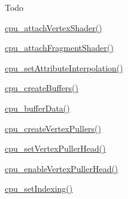 \begin{DoxyRefDesc}{Todo}
\begin{DoxyItemize}
\item \hyperlink{program_8h_aaefc7833a6deea461cc06d00318f7975}{cpu\+\_\+attach\+Vertex\+Shader()}
\item \hyperlink{program_8h_a402ad69a9f1b80b8de408b991e190ed6}{cpu\+\_\+attach\+Fragment\+Shader()}
\item \hyperlink{program_8h_aca1c5019ec58c919160c4c12a5e5fa06}{cpu\+\_\+set\+Attribute\+Interpolation()}
\item \hyperlink{buffer_8h_a6ba9c58dc4b7bc81e83d3dae3c6b292f}{cpu\+\_\+create\+Buffers()}
\item \hyperlink{buffer_8h_aad292278b58c11db74df3cb3e3a52f22}{cpu\+\_\+buffer\+Data()}
\item \hyperlink{vertexPuller_8h_a3b9678475f48f09c3ddbd4316fce3e08}{cpu\+\_\+create\+Vertex\+Pullers()}
\item \hyperlink{vertexPuller_8h_a07be46ae38b8ec80ec85581a33b02786}{cpu\+\_\+set\+Vertex\+Puller\+Head()}
\item \hyperlink{vertexPuller_8h_afc4c70416bc0e515e75ec90c8c8d1584}{cpu\+\_\+enable\+Vertex\+Puller\+Head()}
\item \hyperlink{vertexPuller_8h_aa312eaf555d453ead6a430f8f058c9a6}{cpu\+\_\+set\+Indexing()} 
\end{DoxyItemize}\end{DoxyRefDesc}
